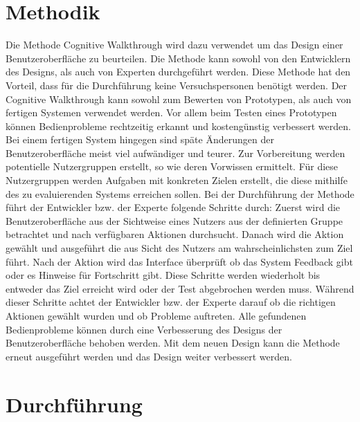 \documentclass[	12pt, 
				a4paper, 
				BCOR=10mm, %
				DIV=12, 
				parskip=half, %
				headings=small, %
				twoside, %
				ngerman,
				bibliography=totoc,index=totoc, listof=totoc,
				numbers=noendperiod
				]{scrbook} %
\theoremstyle{plain}%
\theoremstyle{definition}
\theoremstyle{remark}
\begin{document}
\chapter{Methodik}
Die Methode Cognitive Walkthrough wird dazu verwendet um das Design einer Benutzeroberfläche zu beurteilen. Die Methode kann sowohl von den Entwicklern des Designs, als auch von Experten durchgeführt werden. Diese Methode hat den Vorteil, dass für die Durchführung keine Versuchspersonen benötigt werden. Der Cognitive Walkthrough kann sowohl zum Bewerten von Prototypen, als auch von fertigen Systemen verwendet werden. Vor allem beim Testen eines Prototypen können Bedienprobleme rechtzeitig erkannt und kostengünstig verbessert werden. Bei einem fertigen System hingegen sind späte Änderungen der Benutzeroberfläche meist viel aufwändiger und teurer. Zur Vorbereitung werden potentielle Nutzergruppen erstellt, so wie deren Vorwissen ermittelt. Für diese Nutzergruppen werden Aufgaben mit konkreten Zielen erstellt, die diese mithilfe des zu evaluierenden Systems erreichen sollen. Bei der Durchführung der Methode führt der Entwickler bzw. der Experte folgende Schritte durch: Zuerst wird die Benutzeroberfläche aus der Sichtweise eines Nutzers aus der definierten Gruppe betrachtet und nach verfügbaren Aktionen durchsucht. Danach wird die Aktion gewählt und ausgeführt die aus Sicht des Nutzers am wahrscheinlichsten zum Ziel führt. Nach der Aktion wird das Interface überprüft ob das System Feedback gibt oder es Hinweise für Fortschritt gibt. Diese Schritte werden wiederholt bis entweder das Ziel erreicht wird oder der Test abgebrochen werden muss. Während dieser Schritte achtet der Entwickler bzw. der Experte darauf ob die richtigen Aktionen gewählt wurden und ob Probleme auftreten. Alle gefundenen Bedienprobleme können durch eine Verbesserung des Designs der Benutzeroberfläche behoben werden. Mit dem neuen Design kann die Methode erneut ausgeführt werden und das Design weiter verbessert werden.

\chapter{Durchführung}
\end{document}
